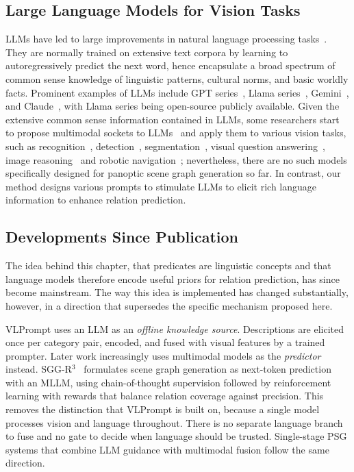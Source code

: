 \subsection{Large Language Models for Vision Tasks}
\label{vlprompt:sec:llm}
LLMs have led to large improvements in natural language processing tasks~\citep{min2023recent}.
They are normally trained on extensive text corpora by learning to autoregressively predict the next word, hence encapsulate a broad spectrum of common sense knowledge of linguistic patterns, cultural norms, and basic worldly facts.
Prominent examples of LLMs include GPT series~\citep{chatgpt}, Llama series~\citep{touvron2023llama1, touvron2023llama}, Gemini~\citep{gemini}, and Claude~\citep{claude}, with Llama series being open-source publicly available.
Given the extensive common sense information contained in LLMs, some researchers start to propose multimodal sockets to LLMs~\citep{zhang2024vision, wu2024towards} and apply them to various vision tasks, such as recognition~\citep{huang2023inject, wang2023all}, detection~\citep{tang2023cotdet, zhang2023next, qi2024generalizable}, segmentation~\citep{lai2023lisa, zhou2023text, xia2024gsva}, visual question answering~\citep{liu2023large, xenos2023simple}, image reasoning~\citep{chen2023large, zhang2024omg} and robotic navigation~\citep{tsai2023multimodal, shah2023lm}; nevertheless, there are no such models specifically designed for panoptic scene graph generation so far.
In contrast, our method designs various prompts to stimulate LLMs to elicit rich language information to enhance relation prediction.


\subsection{Developments Since Publication}
\label{vlprompt:sec:post_publication}
The idea behind this chapter, that predicates are linguistic concepts and that language models therefore encode useful priors for relation prediction, has since become mainstream. The way this idea is implemented has changed substantially, however, in a direction that supersedes the specific mechanism proposed here.

VLPrompt uses an LLM as an \emph{offline knowledge source}. Descriptions are elicited once per category pair, encoded, and fused with visual features by a trained prompter. Later work increasingly uses multimodal models as the \emph{predictor} instead. SGG-R$^3$~\citep{feng2026sggr3} formulates scene graph generation as next-token prediction with an MLLM, using chain-of-thought supervision followed by reinforcement learning with rewards that balance relation coverage against precision. This removes the distinction that VLPrompt is built on, because a single model processes vision and language throughout. There is no separate language branch to fuse and no gate to decide when language should be trusted. Single-stage PSG systems that combine LLM guidance with multimodal fusion follow the same direction.

